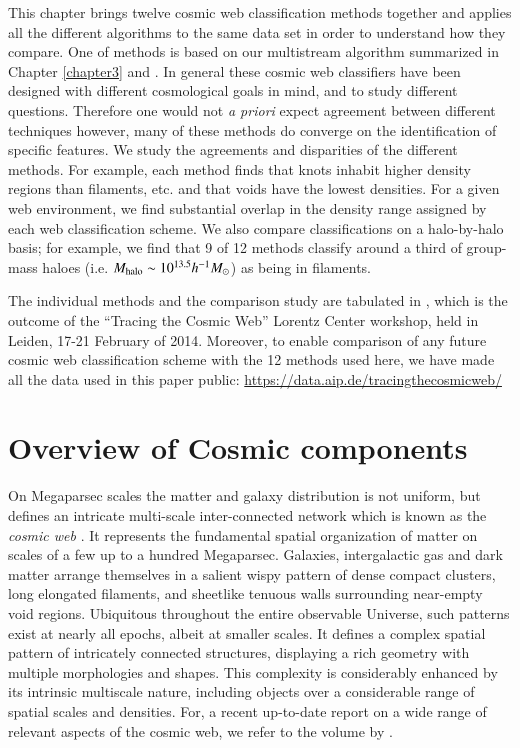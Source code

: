 This chapter brings twelve cosmic web classification methods together and applies all the different algorithms to the same data set in order to understand how they compare. One of methods is based on our multistream algorithm summarized in Chapter \ref{chapter3} and \cite{Ramachandra2015}. In general these cosmic web classifiers have been designed with different cosmological goals in mind, and to study different questions. Therefore one would not {\it a priori} expect agreement between different techniques however, many of these methods do converge on the identification of specific features. We study the agreements and disparities of the different methods. For example, each method finds that knots inhabit higher density regions than filaments, etc. and that voids have the lowest densities. For a given web environment, we find substantial overlap in the density range assigned by each web classification scheme. We also compare classifications on a halo-by-halo basis; for example, we find that 9 of 12 methods classify around a third of group-mass haloes (i.e. $M_{\rm halo}\sim10^{13.5}h^{-1}M_{\odot}$) as being in filaments. 

The individual methods and the comparison study are tabulated in \cite{Libeskind2018}, which is the outcome of the ``Tracing the Cosmic Web'' Lorentz Center workshop, held in Leiden, 17-21 February of 2014. Moreover, to enable comparison of any future cosmic web classification scheme with the 12 methods used here, we have made all the data used in this paper public: \url{https://data.aip.de/tracingthecosmicweb/}


\section{Overview of Cosmic components}
\label{section:intro}
On Megaparsec scales the matter and galaxy distribution is not uniform, but defines an intricate multi-scale inter-connected network 
which is known as the \emph{cosmic web} \citep{Bond1996}. It represents the fundamental spatial organization of 
matter on scales of a few up to a hundred Megaparsec. Galaxies, intergalactic gas and dark matter arrange themselves in a salient wispy 
pattern of dense compact clusters, long elongated filaments, and sheetlike tenuous walls surrounding near-empty void regions. Ubiquitous throughout  
the entire observable Universe, such patterns  exist at nearly all epochs, albeit at smaller scales. It defines a complex spatial 
pattern of intricately connected structures, displaying a rich geometry with multiple morphologies and shapes. This complexity is 
considerably enhanced by its intrinsic multiscale nature, including objects over a considerable range of spatial scales and densities. 
For, a recent up-to-date report on a wide range of relevant aspects of the cosmic web, we refer to the volume by \cite{Iau308}.

